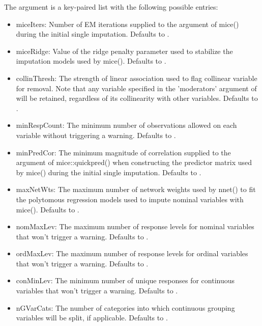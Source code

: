 \documentclass[letterpaper]{book}
\begin{document}
\begin{Details}
The  argument is a key-paired list with the following
possible entries:
\begin{itemize}

\item miceIters: 
Number of EM iterations supplied to the  argument of
mice() during the initial single imputation. Defaults to
.

\item miceRidge: 
Value of the ridge penalty parameter used to stabilize the
imputation models used by mice(). Defaults to .

\item collinThresh: 
The strength of linear association used to flag collinear variable
for removal. Note that any variable specified in the 'moderators'
argument of  will be retained, regardless of its
collinearity with other variables. Defaults to .

\item minRespCount: 
The minimum number of observations allowed on each variable without
triggering a warning. Defaults to .

\item minPredCor: 
The minimum magnitude of correlation supplied to the
 argument of mice::quickpred() when constructing the
predictor matrix used by mice() during the initial single
imputation. Defaults to .

\item maxNetWts: 
The maximum number of network weights used by nnet() to fit the
polytomous regression models used to impute nominal variables with
mice(). Defaults to .

\item nomMaxLev: 
The maximum number of response levels for nominal variables that
won't trigger a warning. Defaults to .

\item ordMaxLev: 
The maximum number of response levels for ordinal variables that
won't trigger a warning. Defaults to .

\item conMinLev: 
The minimum number of unique responses for continuous variables that
won't trigger a warning. Defaults to .

\item nGVarCats: 
The number of categories into which continuous grouping variables
will be split, if applicable. Defaults to .


\end{itemize}
\end{Details}
\end{document}
